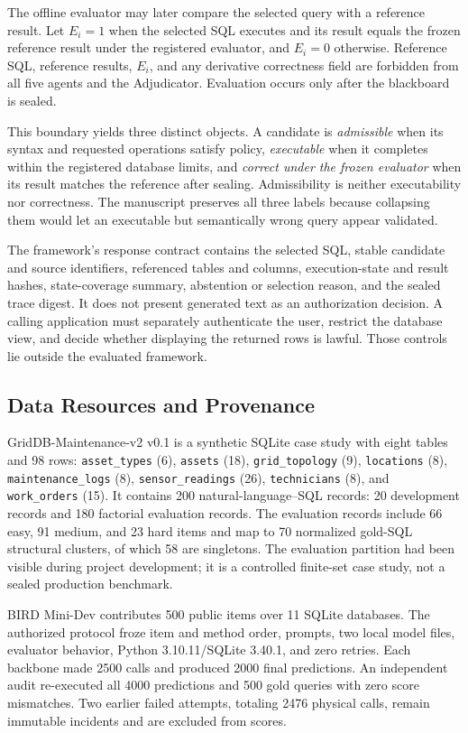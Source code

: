 \documentclass[applsci,article,submit,moreauthors]{Definitions/mdpi}
\begin{document}
The offline evaluator may later compare the selected query with a reference result. Let $E_i=1$ when the selected SQL executes and its result equals the frozen reference result under the registered evaluator, and $E_i=0$ otherwise. Reference SQL, reference results, $E_i$, and any derivative correctness field are forbidden from all five agents and the Adjudicator. Evaluation occurs only after the blackboard is sealed.

This boundary yields three distinct objects. A candidate is \emph{admissible} when its syntax and requested operations satisfy policy, \emph{executable} when it completes within the registered database limits, and \emph{correct under the frozen evaluator} when its result matches the reference after sealing. Admissibility is neither executability nor correctness. The manuscript preserves all three labels because collapsing them would let an executable but semantically wrong query appear validated.

The framework's response contract contains the selected SQL, stable candidate and source identifiers, referenced tables and columns, execution-state and result hashes, state-coverage summary, abstention or selection reason, and the sealed trace digest. It does not present generated text as an authorization decision. A calling application must separately authenticate the user, restrict the database view, and decide whether displaying the returned rows is lawful. Those controls lie outside the evaluated framework.

\subsection{Data Resources and Provenance}

GridDB-Maintenance-v2 v0.1 is a synthetic SQLite case study with eight tables and 98 rows: \texttt{asset\_types} (6), \texttt{assets} (18), \texttt{grid\_topology} (9), \texttt{locations} (8), \texttt{maintenance\_logs} (8), \texttt{sensor\_readings} (26), \texttt{technicians} (8), and \texttt{work\_orders} (15). It contains 200 natural-language--SQL records: 20 development records and 180 factorial evaluation records. The evaluation records include 66 easy, 91 medium, and 23 hard items and map to 70 normalized gold-SQL structural clusters, of which 58 are singletons. The evaluation partition had been visible during project development; it is a controlled finite-set case study, not a sealed production benchmark.

BIRD Mini-Dev contributes 500 public items over 11 SQLite databases. The authorized protocol froze item and method order, prompts, two local model files, evaluator behavior, Python 3.10.11/SQLite 3.40.1, and zero retries. Each backbone made 2500 calls and produced 2000 final predictions. An independent audit re-executed all 4000 predictions and 500 gold queries with zero score mismatches. Two earlier failed attempts, totaling 2476 physical calls, remain immutable incidents and are excluded from scores.
\end{document}
